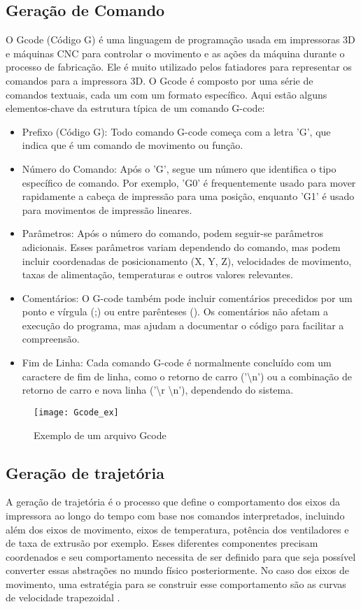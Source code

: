 \subsection{Geração de Comando}

O Gcode (Código G) é uma linguagem de programação usada em impressoras 3D e máquinas CNC para controlar o movimento e as ações da máquina durante o processo de fabricação. Ele é muito utilizado pelos fatiadores para representar os comandos para a impressora 3D. O Gcode é composto por uma série de comandos textuais, cada um com um formato específico. Aqui estão alguns elementos-chave da estrutura típica de um comando G-code:

\begin{itemize}
    \item Prefixo (Código G): Todo comando G-code começa com a letra 'G', que indica que é um comando de movimento ou função.
    \item Número do Comando: Após o 'G', segue um número que identifica o tipo específico de comando. Por exemplo, 'G0' é frequentemente usado para mover rapidamente a cabeça de impressão para uma posição, enquanto 'G1' é usado para movimentos de impressão lineares.
    \item Parâmetros: Após o número do comando, podem seguir-se parâmetros adicionais. Esses parâmetros variam dependendo do comando, mas podem incluir coordenadas de posicionamento (X, Y, Z), velocidades de movimento, taxas de alimentação, temperaturas e outros valores relevantes.
    \item Comentários: O G-code também pode incluir comentários precedidos por um ponto e vírgula (;) ou entre parênteses (). Os comentários não afetam a execução do programa, mas ajudam a documentar o código para facilitar a compreensão.
    \item Fim de Linha: Cada comando G-code é normalmente concluído com um caractere de fim de linha, como o retorno de carro ('\textbackslash n') ou a combinação de retorno de carro e nova linha ('\textbackslash r \textbackslash n'), dependendo do sistema.
\end{itemize}

\begin{figure}[H]
    \centering
    \caption{Exemplo de um arquivo Gcode}
    \texttt{[image: Gcode\_ex]}
    \label{fig:gcode_ex}
\end{figure}

\subsection{Geração de trajetória}
A geração de trajetória é o processo que define o comportamento dos eixos da impressora ao longo do tempo com base nos comandos interpretados, incluindo além dos eixos de movimento, eixos de temperatura, potência dos ventiladores e de taxa de extrusão por exemplo. Esses diferentes componentes precisam coordenados e seu comportamento necessita de ser definido para que seja possível converter essas abstrações no mundo físico posteriormente. No caso dos eixos de movimento, uma estratégia para se construir esse comportamento são as curvas de velocidade trapezoidal \cite{yu20}. 

